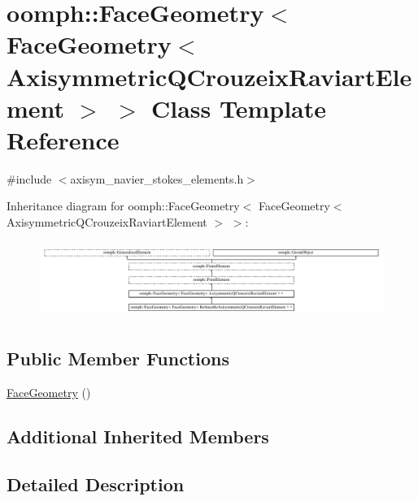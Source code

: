 \hypertarget{classoomph_1_1FaceGeometry_3_01FaceGeometry_3_01AxisymmetricQCrouzeixRaviartElement_01_4_01_4}{}\section{oomph\+:\+:Face\+Geometry$<$ Face\+Geometry$<$ Axisymmetric\+Q\+Crouzeix\+Raviart\+Element $>$ $>$ Class Template Reference}
\label{classoomph_1_1FaceGeometry_3_01FaceGeometry_3_01AxisymmetricQCrouzeixRaviartElement_01_4_01_4}


{\ttfamily \#include $<$axisym\+\_\+navier\+\_\+stokes\+\_\+elements.\+h$>$}

Inheritance diagram for oomph\+:\+:Face\+Geometry$<$ Face\+Geometry$<$ Axisymmetric\+Q\+Crouzeix\+Raviart\+Element $>$ $>$\+:\begin{figure}[H]
\begin{center}
\leavevmode
\includegraphics[height=2.522522cm]{classoomph_1_1FaceGeometry_3_01FaceGeometry_3_01AxisymmetricQCrouzeixRaviartElement_01_4_01_4}
\end{center}
\end{figure}
\subsection*{Public Member Functions}
\begin{DoxyCompactItemize}
\item 
\hyperlink{classoomph_1_1FaceGeometry_3_01FaceGeometry_3_01AxisymmetricQCrouzeixRaviartElement_01_4_01_4_ab23b8b50e56f9c8e6f46551ed8007599}{Face\+Geometry} ()
\end{DoxyCompactItemize}
\subsection*{Additional Inherited Members}


\subsection{Detailed Description}
